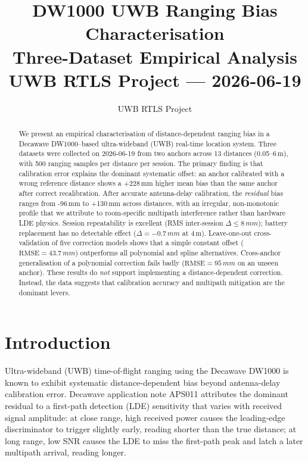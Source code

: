 \documentclass[10pt,a4paper,twocolumn]{article}
\title{\textbf{DW1000 UWB Ranging Bias Characterisation}\\
\large Three-Dataset Empirical Analysis\\[0.3em]
{\small UWB RTLS Project — 2026-06-19}}
\author{UWB RTLS Project}
\date{}
\begin{document}
\maketitle

\begin{abstract}
We present an empirical characterisation of distance-dependent ranging bias in
a Decawave DW1000--based ultra-wideband (UWB) real-time location system.
Three datasets were collected on 2026-06-19 from two anchors across
13 distances (0.05--6\,m), with 500 ranging samples per
distance per session.  The primary finding is that calibration error explains
the dominant systematic offset: an anchor calibrated with a wrong reference
distance shows a +228\,mm higher mean bias than the same anchor after
correct recalibration.  After accurate antenna-delay calibration, the
\emph{residual} bias ranges from -96\,mm to +130\,mm across
distances, with an irregular, non-monotonic profile that we attribute to
room-specific multipath interference rather than hardware LDE physics.  Session
repeatability is excellent (RMS inter-session $\Delta \le 8\,mm$);
battery replacement has no detectable effect ($\Delta = -0.7\,mm$ at
4\,m).  Leave-one-out cross-validation of five correction models shows
that a simple constant offset ($\text{RMSE} = 43.7\,mm$) outperforms all
polynomial and spline alternatives.  Cross-anchor generalisation of a
polynomial correction fails badly ($\text{RMSE} = 95\,mm$ on an unseen
anchor).  These results do \emph{not} support implementing a distance-dependent
correction.  Instead, the data suggests that calibration accuracy and multipath
mitigation are the dominant levers.
\end{abstract}

\section{Introduction}

Ultra-wideband (UWB) time-of-flight ranging using the Decawave DW1000 is known
to exhibit systematic distance-dependent bias beyond antenna-delay calibration
error.  Decawave application note APS011 attributes the dominant residual to a
first-path detection (LDE) sensitivity that varies with received signal
amplitude: at close range, high received power causes the leading-edge
discriminator to trigger slightly early, reading shorter than the true distance;
at long range, low SNR causes the LDE to miss the first-path peak and latch a
later multipath arrival, reading longer.
\end{document}
